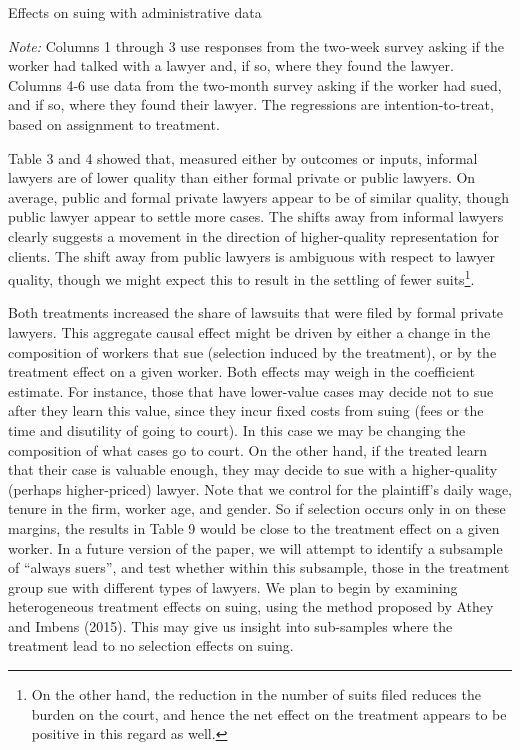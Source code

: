 \documentclass[12 pt]{article}
\newenvironment{figurenotes}[1][\footnotesize{Note}]{\begin{minipage}[t]{\linewidth}\footnotesize{\itshape#1: }}{\end{minipage}}
\begin{document}
\begin{table}[!ht]
    \caption{Effects on suing with administrative data} 
    \label{tab:9_lawyer_uncond}
    \center
    \scriptsize{}
    \begin{figurenotes}
    Columns 1 through 3 use responses from the two-week survey asking if the worker had talked with a lawyer and, if so, where they found the lawyer. Columns 4-6 use data from the two-month survey asking if the worker had sued, and if so, where they found their lawyer. The regressions are intention-to-treat, based on assignment to treatment.
    \end{figurenotes}
  
\end{table}

Table 3 and 4 showed that, measured either by outcomes or inputs, informal lawyers are of lower quality than either formal private or public lawyers. On average, public and formal private lawyers appear to be of similar quality, though public lawyer appear to settle more cases. The shifts away from informal lawyers clearly suggests a movement in the direction of higher-quality representation for clients. The shift away from public lawyers is ambiguous with respect to lawyer quality, though we might expect this to result in the settling of fewer suits\footnote{ On the other hand, the reduction in the number of suits filed reduces the burden on the court, and hence the net effect on the treatment appears to be positive in this regard as well. }.  

Both treatments increased the share of lawsuits that were filed by formal private lawyers. This aggregate causal effect might be driven by either a change in the composition of workers that sue (selection induced by the treatment), or by the treatment effect on a given worker. Both effects may weigh in the coefficient estimate. For instance, those that have lower-value cases may decide not to sue after they learn this value, since they incur fixed costs from suing (fees or the time and disutility of going to court). In this case we may be changing the composition of what cases go to court. On the other hand, if the treated learn that their case is valuable enough, they may decide to sue with a higher-quality (perhaps higher-priced) lawyer. Note that we control for the plaintiff’s daily wage, tenure in the firm, worker age, and gender. So if selection occurs only in on these margins, the results in Table 9 would be close to the treatment effect on a given worker. In a future version of the paper, we will attempt to identify a subsample of “always suers”, and test whether within this subsample, those in the treatment group sue with different types of lawyers. We plan to begin by examining heterogeneous treatment effects on suing, using the method proposed by Athey and Imbens (2015). This may give us insight into sub-samples where the treatment lead to no selection effects on suing. 
\end{document}
